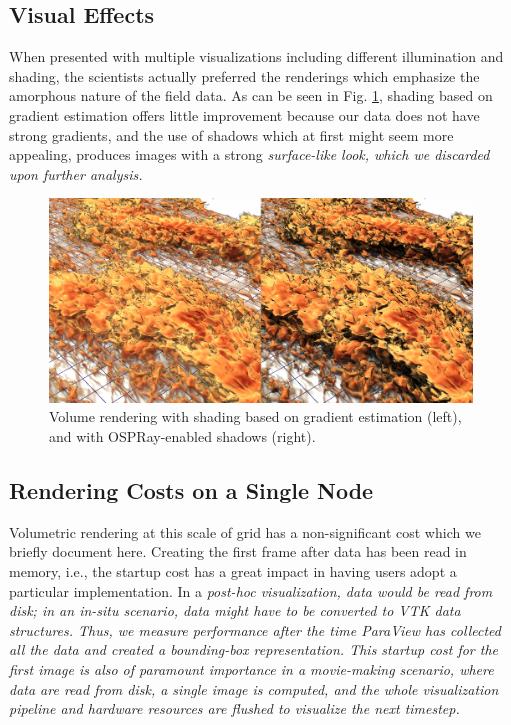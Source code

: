 \documentclass[final,5p,times,twocolumn]{elsarticle}
\begin{document}
\subsection{Visual Effects}

When presented with multiple visualizations including different illumination and
shading, the scientists actually preferred the renderings which emphasize the
amorphous nature of the field data. As can be seen in Fig. \ref{fig:shadings},
shading based on gradient estimation offers little improvement because our data
does not have strong gradients, and the use of shadows which at first might seem
more appealing, produces images with a strong \it{surface-like} \rm look, which
we discarded upon further analysis.

\begin{figure}
	\centering
	\includegraphics[width=\linewidth]{fig2montage}%
	\caption{\label{fig:shadings} Volume rendering with shading based on gradient
estimation (left), and with OSPRay-enabled shadows (right).}
\end{figure}


\subsection{Rendering Costs on a Single Node}

Volumetric rendering at this scale of grid has a non-significant cost which we
briefly document here. Creating the first frame after data has been read in memory,
 i.e., the startup cost has a great impact in having users adopt a particular implementation.
In a \it{post-hoc} \rm visualization, data would be read from disk; in an \it{in-situ} \rm
scenario, data might have to be converted to VTK data structures. Thus, we measure performance
after the time ParaView has collected all the data and created a bounding-box representation. This startup cost for the first image is also of paramount importance in a movie-making scenario, where data are read from disk, a single image is computed, and the whole visualization pipeline and hardware resources are flushed to visualize the next timestep.
\end{document}
